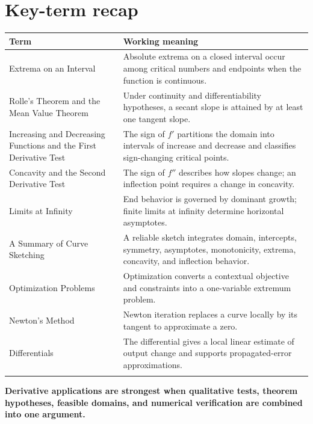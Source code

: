 \documentclass[11pt]{article}
\begin{document}
\normalsize

\section{Key-term recap}
\small
\begin{longtable}{@{}>{\RaggedRight\arraybackslash}p{}>{\RaggedRight\arraybackslash}p{}@{}}
\toprule
\textbf{Term} & \textbf{Working meaning}\\
\midrule\endhead
Extrema on an Interval & Absolute extrema on a closed interval occur among critical numbers and endpoints when the function is continuous. \\\addlinespace[2pt]
Rolle's Theorem and the Mean Value Theorem & Under continuity and differentiability hypotheses, a secant slope is attained by at least one tangent slope. \\\addlinespace[2pt]
Increasing and Decreasing Functions and the First Derivative Test & The sign of $f'$ partitions the domain into intervals of increase and decrease and classifies sign-changing critical points. \\\addlinespace[2pt]
Concavity and the Second Derivative Test & The sign of $f''$ describes how slopes change; an inflection point requires a change in concavity. \\\addlinespace[2pt]
Limits at Infinity & End behavior is governed by dominant growth; finite limits at infinity determine horizontal asymptotes. \\\addlinespace[2pt]
A Summary of Curve Sketching & A reliable sketch integrates domain, intercepts, symmetry, asymptotes, monotonicity, extrema, concavity, and inflection behavior. \\\addlinespace[2pt]
Optimization Problems & Optimization converts a contextual objective and constraints into a one-variable extremum problem. \\\addlinespace[2pt]
Newton's Method & Newton iteration replaces a curve locally by its tangent to approximate a zero. \\\addlinespace[2pt]
Differentials & The differential gives a local linear estimate of output change and supports propagated-error approximations. \\\addlinespace[2pt]
\bottomrule
\end{longtable}
\normalsize

\enlargethispage{4\baselineskip}
\begin{tcolorbox}[title=One-sentence takeaway,fonttitle=\bfseries,colback=Ink,colframe=Ink,coltext=white,coltitle=white,arc=2mm,boxrule=0pt]
\centering\bfseries Derivative applications are strongest when qualitative tests, theorem hypotheses, feasible domains, and numerical verification are combined into one argument.
\end{tcolorbox}
\end{document}

